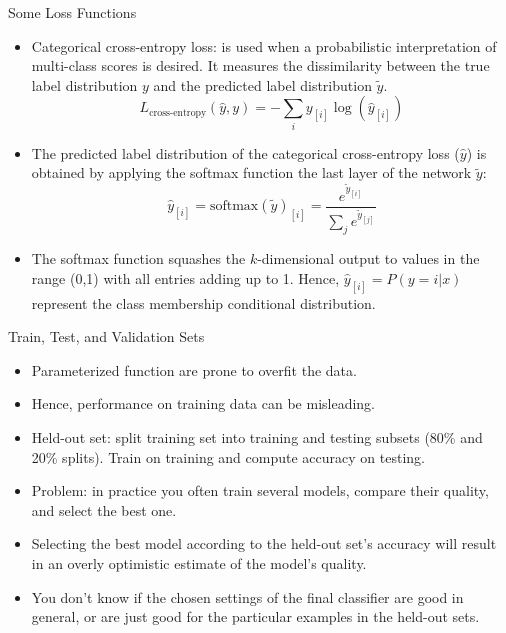 \documentclass[handout]{beamer}
\begin{document}
\begin{frame}{Some Loss Functions}
\begin{scriptsize}
\begin{itemize}

 \item Categorical cross-entropy loss:  is used when a probabilistic interpretation of multi-class scores is desired. It measures the dissimilarity between the true label distribution $y$ and the predicted label distribution $\tilde{y}$. 
   \begin{displaymath}
  L_{\text{cross-entropy}}(\hat{y},y) = - \sum_{i} y_{[i]} \log(\hat{y}_{[i]})   
 \end{displaymath}
\item The predicted label distribution of the categorical cross-entropy loss ($\hat{y}$) is obtained by applying the softmax function the last layer of the network $\tilde{y}$:
    \begin{displaymath}
\hat{y}_{[i]} = \text{softmax}(\tilde{y})_{[i]} =  \frac{e^{\tilde{y}_{[i]}}}{\sum_{j}e^{\tilde{y}_{[j]}}}   
 \end{displaymath}
 
\item The softmax function squashes the $k$-dimensional output to values in the range (0,1) with all entries adding up to 1. Hence, $\hat{y}_{[i]} = P( y = i |x)$ represent the class membership conditional distribution.
 
\end{itemize}
\end{scriptsize}


\end{frame}




\begin{frame}{Train, Test, and Validation Sets}
\begin{scriptsize}
\begin{itemize}
\item Parameterized function are prone to overfit the data.
\item Hence, performance on training data can be misleading.
\item Held-out set: split training set into training and testing subsets (80\% and 20\% splits). Train on training and compute accuracy on testing.
\item Problem: in practice you often train several models, compare their quality, and select the best one. 
\item Selecting the best model according to the held-out set's accuracy will result in an overly optimistic estimate of the model's quality.
\item You don't know if the chosen settings of the final classifier are good in general, or are just good for the particular examples in the held-out sets.

\end{itemize}
\end{scriptsize}
\end{frame}
\end{document}

